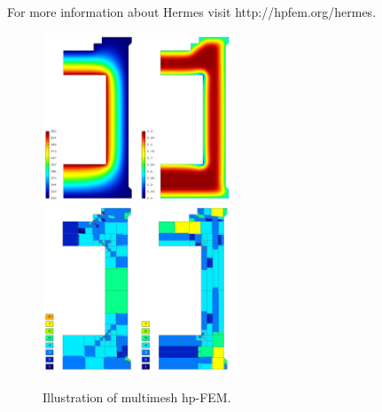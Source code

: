 \documentclass[12pt]{elsarticle}
\begin{document}
For more information about Hermes visit {http://hpfem.org/hermes}.

\begin{figure}[H]
\centering
\includegraphics[height=5cm]{img/hermes_hm_sol.png}
\hspace{10mm}
\includegraphics[height=5cm]{img/hermes_hm_mesh.png}
\caption{Illustration of multimesh hp-FEM.}
\label{fig:hermes_hm}
\end{figure}
\noindent






\end{document}
